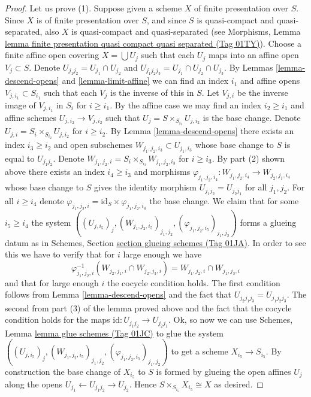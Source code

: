 \documentclass{amsart}
\theoremstyle{plain}
\theoremstyle{definition}
\theoremstyle{remark}
\numberwithin{equation}{subsection}
\begin{document}
\begin{proof}
\medskip\noindent
Let us prove (1). Suppose given a scheme $X$ of finite presentation
over $S$. Since $X$ is of finite presentation
over $S$, and since $S$ is quasi-compact and quasi-separated, also
$X$ is quasi-compact and quasi-separated
(see Morphisms,
Lemma \href{https://stacks.math.columbia.edu/tag/01TY}{lemma finite presentation quasi compact quasi separated (Tag 01TY)}).
Choose a finite affine open covering $X = \bigcup U_j$
such that each $U_j$ maps into an affine open $V_j \subset S$.
Denote $U_{j_1j_2} = U_{j_1} \cap U_{j_2}$ and
$U_{j_1j_2j_3} = U_{j_1} \cap U_{j_2} \cap U_{j_3}$.
By Lemmas \ref{lemma-descend-opens} and \ref{lemma-limit-affine}
we can find an index $i_1$ and affine opens $V_{j, i_1} \subset S_{i_1}$
such that each $V_j$ is the inverse of this in $S$.
Let $V_{j, i}$ be the inverse image of $V_{j, i_1}$ in $S_i$ for
$i \geq i_1$. By the affine case we may find an index $i_2 \geq i_1$ and
affine schemes $U_{j, i_2} \to V_{j, i_2}$ such
that $U_j = S \times_{S_{i_2}} U_{j, i_2}$ is the base change.
Denote $U_{j, i} = S_i \times_{S_{i_2}} U_{j, i_2}$ for $i \geq i_2$.
By Lemma \ref{lemma-descend-opens} there exists an index
$i_3 \geq i_2$ and open subschemes
$W_{j_1, j_2, i_3} \subset U_{j_1, i_3}$
whose base change to $S$ is equal to $U_{j_1j_2}$.
Denote $W_{j_1, j_2, i} = S_i \times_{S_{i_3}} W_{j_1, j_2, i_3}$
for $i \geq i_3$. By part (2) shown above there exists an index
$i_4 \geq i_3$ and morphisms
$\varphi_{j_1, j_2, i_4} : W_{j_1, j_2, i_4} \to W_{j_2, j_1, i_4}$
whose base change to $S$ gives the identity morphism
$U_{j_1j_2} = U_{j_2j_1}$ for all $j_1, j_2$.
For all $i \geq i_4$ denote
$\varphi_{j_1, j_2, i} = \text{id}_S \times \varphi_{j_1, j_2, i_4}$
the base change. We claim that for some $i_5 \geq i_4$ the system
$((U_{j, i_5})_j, (W_{j_1, j_2, i_5})_{j_1, j_2},
(\varphi_{j_1, j_2, i_5})_{j_1, j_2})$ forms a glueing datum
as in Schemes, Section \href{https://stacks.math.columbia.edu/tag/01JA}{section glueing schemes (Tag 01JA)}.
In order to see this we have to verify that for $i$ large enough
we have
$$
\varphi_{j_1, j_2, i}^{-1}(W_{j_2, j_1, i} \cap W_{j_2, j_3, i})
=
W_{j_1, j_2, i} \cap W_{j_1, j_3, i}
$$
and that for large enough $i$ the cocycle condition holds.
The first condition follows from Lemma \ref{lemma-descend-opens}
and the fact that $U_{j_2j_1j_3} = U_{j_1j_2j_3}$.
The second from part (3) of the lemma proved above and the fact
that the cocycle condition holds for the maps
$\text{id} : U_{j_1j_2} \to U_{j_2j_1}$.
Ok, so now we can use Schemes, Lemma \href{https://stacks.math.columbia.edu/tag/01JC}{lemma glue schemes (Tag 01JC)}
to glue the system
$((U_{j, i_5})_j, (W_{j_1, j_2, i_5})_{j_1, j_2},
(\varphi_{j_1, j_2, i_5})_{j_1, j_2})$ to get a scheme
$X_{i_5} \to S_{i_5}$. By construction the base change of
$X_{i_5}$ to $S$ is formed by glueing the open affines
$U_j$ along the opens $U_{j_1} \leftarrow U_{j_1j_2} \rightarrow U_{j_2}$.
Hence $S \times_{S_{i_5}} X_{i_5} \cong X$ as desired.
\end{proof}
\end{document}
